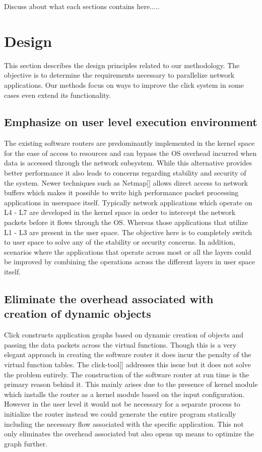 \documentclass[conference]{IEEEtran}
\begin{document}
Discuss about what each sections contains here.....  

\section{Design}

This section describes the design principles related to our methodology. The objective is to determine the requirements necessary to parallelize network applications. Our methods focus on ways to improve the click system in some cases even extend its functionality.

\subsection{Emphasize on user level execution environment}

The existing software routers are predominantly implemented in the kernel space for the ease of access to resources and can bypass the OS overhead incurred when data is accessed through the network subsystem. While this alternative provides better performance it also leads to concerns regarding stability and security of the system. Newer techniques such as Netmap[] allows direct access to network buffers which makes it possible to write high performance packet processing applications in userspace itself. Typically network applications which operate on L4 - L7 are developed in the kernel space in order to intercept the network packets before it flows through the OS. Whereas those applications that utilize L1 - L3 are present in the user space. The objective here is to completely switch to user space to solve any of the stability or security concerns. In addition, scenarios where the applications that operate across most or all the layers could be improved by combining the operations across the different layers in user space itself.  

\subsection{Eliminate the overhead associated with creation of dynamic objects}

Click constructs application graphs based on dynamic creation of objects and passing the data packets across the virtual functions. Though this is a very elegant approach in creating the software router it does incur the penalty of the virtual function tables. The click-tool[] addresses this issue but it does not solve the problem entirely. The construction of the software router at run time is the primary reason behind it. This mainly arises due to the presence of kernel module which installs the router as a kernel module based on the input configuration. However in the user level it would not be necessary for a separate process to initialize the router instead we could generate the entire program statically including the necessary flow associated with the specific application. This not only eliminates the overhead associated but also opens up means to optimize the graph further. 
\end{document}
